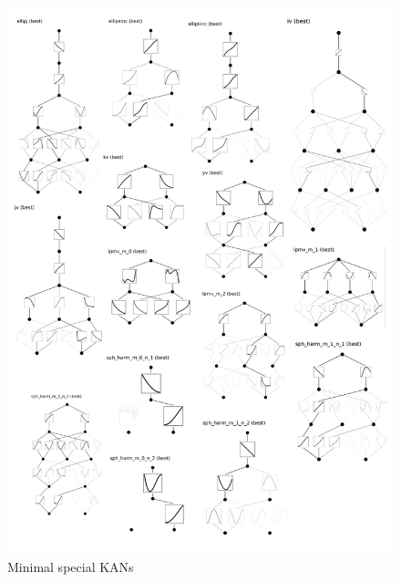 \documentclass{article}
\numberwithin{equation}{section}
\numberwithin{figure}{section}
\begin{document}
\begin{figure}[t]
    \centering
    \includegraphics[width=1\linewidth]{figs/minimal_special_kan.pdf}
    \caption{Minimal special KANs}
    \label{fig:minimal-special-kan}
\end{figure}
\end{document}
